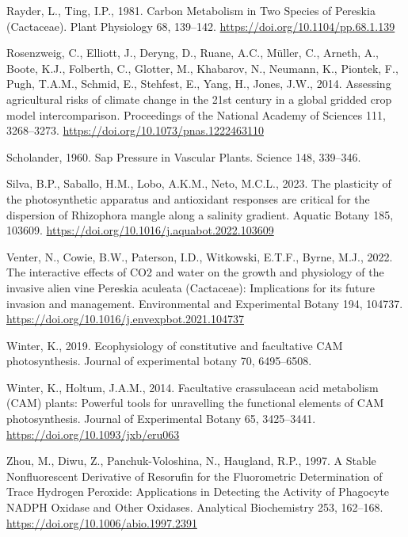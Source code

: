 \documentclass[
  12pt,
  letterpaper,
  DIV=11,
  numbers=noendperiod]{scrartcl}
\newlength{\cslhangindent}
\newlength{\cslentryspacingunit} %
\newenvironment{CSLReferences}[2] %
 {%
  \setlength{\parindent}{0pt}
  \ifodd #1
  \let\oldpar\par
  \def\par{\hangindent=\cslhangindent\oldpar}
  \fi
  \setlength{\parskip}{#2\cslentryspacingunit}
 }%
 {}
\begin{document}
\begin{CSLReferences}{1}{0}
\leavevmode{}%
Rayder, L., Ting, I.P., 1981. Carbon {Metabolism} in {Two Species} of
{Pereskia} ({Cactaceae}). Plant Physiology 68, 139--142.
\url{https://doi.org/10.1104/pp.68.1.139}

\leavevmode{}%
Rosenzweig, C., Elliott, J., Deryng, D., Ruane, A.C., Müller, C.,
Arneth, A., Boote, K.J., Folberth, C., Glotter, M., Khabarov, N.,
Neumann, K., Piontek, F., Pugh, T.A.M., Schmid, E., Stehfest, E., Yang,
H., Jones, J.W., 2014. Assessing agricultural risks of climate change in
the 21st century in a global gridded crop model intercomparison.
Proceedings of the National Academy of Sciences 111, 3268--3273.
\url{https://doi.org/10.1073/pnas.1222463110}

\leavevmode{}%
Scholander, 1960. Sap {Pressure} in {Vascular Plants}. Science 148,
339--346.

\leavevmode{}%
Silva, B.P., Saballo, H.M., Lobo, A.K.M., Neto, M.C.L., 2023. The
plasticity of the photosynthetic apparatus and antioxidant responses are
critical for the dispersion of {Rhizophora} mangle along a salinity
gradient. Aquatic Botany 185, 103609.
\url{https://doi.org/10.1016/j.aquabot.2022.103609}

\leavevmode{}%
Venter, N., Cowie, B.W., Paterson, I.D., Witkowski, E.T.F., Byrne, M.J.,
2022. The interactive effects of {CO2} and water on the growth and
physiology of the invasive alien vine {Pereskia} aculeata ({Cactaceae}):
{Implications} for its future invasion and management. Environmental and
Experimental Botany 194, 104737.
\url{https://doi.org/10.1016/j.envexpbot.2021.104737}

\leavevmode{}%
Winter, K., 2019. Ecophysiology of constitutive and facultative {CAM}
photosynthesis. Journal of experimental botany 70, 6495--6508.

\leavevmode{}%
Winter, K., Holtum, J.A.M., 2014. Facultative crassulacean acid
metabolism ({CAM}) plants: {Powerful} tools for unravelling the
functional elements of {CAM} photosynthesis. Journal of Experimental
Botany 65, 3425--3441. \url{https://doi.org/10.1093/jxb/eru063}

\leavevmode{}%
Zhou, M., Diwu, Z., Panchuk-Voloshina, N., Haugland, R.P., 1997. A
{Stable Nonfluorescent Derivative} of {Resorufin} for the {Fluorometric
Determination} of {Trace Hydrogen Peroxide}: {Applications} in
{Detecting} the {Activity} of {Phagocyte NADPH Oxidase} and {Other
Oxidases}. Analytical Biochemistry 253, 162--168.
\url{https://doi.org/10.1006/abio.1997.2391}


\end{CSLReferences}
\end{document}
